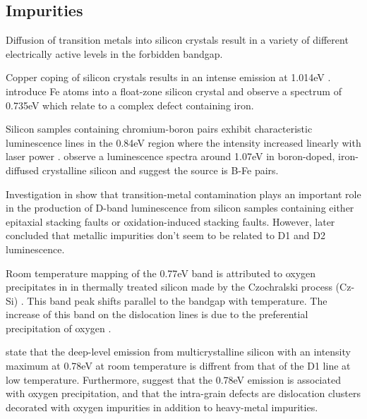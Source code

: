 \subsection{Impurities}

Diffusion of transition metals into silicon crystals result in a variety of different electrically active levels in the forbidden bandgap.


Copper coping of silicon crystals results in an intense emission at 1.014eV \cite{weber82}.
\cite{calao88} introduce Fe atoms into a float-zone silicon crystal and observe a spectrum of 0.735eV which relate to a complex defect containing iron.


Silicon samples containing chromium-boron pairs exhibit characteristic luminescence lines in the 0.84eV region where the intensity increased linearly with laser power \cite{conzelmann83}. \cite{mohring83} observe a luminescence spectra around 1.07eV in boron-doped, iron-diffused crystalline silicon and suggest the source is B-Fe pairs.



Investigation in \cite{higgs92} show that transition-metal contamination plays an important role in the production of D-band luminescence from silicon samples containing either epitaxial stacking faults or oxidation-induced stacking faults. However, \cite{sekiguchi95} later concluded that metallic impurities don't seem to be related to D1 and D2 luminescence. %

Room temperature mapping of the 0.77eV band is attributed to oxygen precipitates in in thermally treated silicon made by the Czochralski process (Cz-Si) \cite{tajima95}. This band peak shifts parallel to the bandgap with temperature. The increase of this band on the dislocation lines is due to the preferential precipitation of oxygen \cite{tajima95}.



\cite{inoue07} state that the deep-level emission from multicrystalline silicon with an intensity maximum at 0.78eV at room temperature is diffrent from that of the D1 line at low temperature. Furthermore, \cite{inoue07} suggest that the 0.78eV emission is associated with oxygen precipitation, and that the intra-grain defects are dislocation clusters decorated with oxygen impurities in addition to heavy-metal impurities.